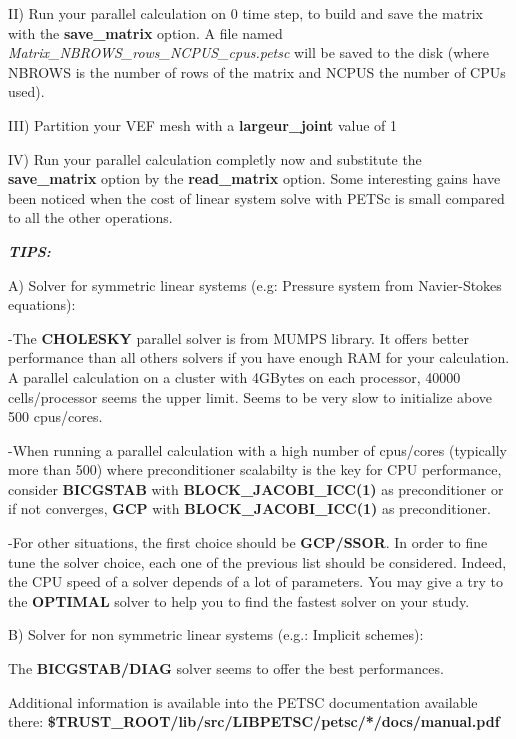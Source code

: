 II) Run your parallel calculation on 0 time step, to build and save the matrix with the \textbf{save\_matrix} option. A
file named \textit{Matrix\_NBROWS\_rows\_NCPUS\_cpus.petsc} will be saved to the disk (where NBROWS is the number of
rows of the matrix and NCPUS the number of CPUs used). 

III) Partition your VEF mesh with a \textbf{largeur\_joint} value of 1

IV) Run your parallel calculation completly now and substitute the \textbf{save\_matrix} option by the
\textbf{read\_matrix} option. Some interesting gains have been noticed when the cost of linear system solve with PETSc
is small compared to all the other operations. 


\bigskip


\bigskip

{\bfseries\itshape
TIPS:}

A) Solver for symmetric linear systems (e.g: Pressure system from Navier-Stokes equations):

{}-The \textbf{CHOLESKY} parallel solver is from MUMPS library. It offers better performance than all others solvers if
you have enough RAM for your calculation. A parallel calculation on a cluster with 4GBytes on each processor, 40000
cells/processor seems the upper limit. Seems to be very slow to initialize above 500 cpus/cores.


\bigskip

{}-When running a parallel calculation with a high number of cpus/cores (typically more than 500) where preconditioner
scalabilty is the key for CPU performance, consider \textbf{BICGSTAB }with \textbf{BLOCK\_JACOBI\_ICC(1)} as
preconditioner or if not converges, \textbf{GCP}\textbf{ }with\textbf{ BLOCK\_JACOBI\_ICC(1) }as
preconditioner.


\bigskip

{}-For other situations, the first choice should be \textbf{GCP}\textbf{/SSOR}. In order to fine
tune the solver choice, each one of the previous list should be considered. Indeed, the CPU speed of a solver depends
of a lot of parameters. You may give a try to the \textbf{OPTIMAL} solver to help you to find the fastest solver on
your study. 


\bigskip

B) Solver for non symmetric linear systems (e.g.: Implicit schemes):

The \textbf{BICGSTAB/DIAG }solver seems to offer the best performances.


\bigskip

Additional information is available into the PETSC documentation available there:
\textbf{\$TRUST\_ROOT/lib/src/LIBPETSC/petsc/*/docs/manual.pdf}

